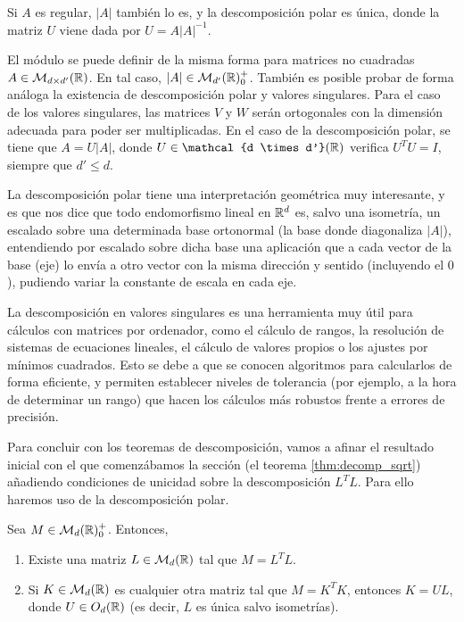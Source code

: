 \begin{remark}
    Si $A$ es regular, $|A|$ también lo es, y la descomposición polar es única, donde la matriz $U$ viene dada por $U = A|A|^{-1}$.
\end{remark}

\begin{remark} \label{rem:polar_generalized}
    El módulo se puede definir de la misma forma para matrices no cuadradas $A \in \mathcal{M}_{d \times d'}(\mathbb{R})$. En tal caso, $|A| \in \mathcal{M}_{d'}(\mathbb{R})^+_0$. También es posible probar de forma análoga la existencia de descomposición polar y valores singulares. Para el caso de los valores singulares, las matrices $V$ y $W$ serán ortogonales con la dimensión adecuada para poder ser multiplicadas. En el caso de la descomposición polar, se tiene que $A = U|A|$, donde $U \in \mathcal{d \times d'}(\R)$ verifica $U^TU = I$, siempre que $d' \le d$.
\end{remark}

La descomposición polar tiene una interpretación geométrica muy interesante, y es que nos dice que todo endomorfismo lineal en $\mathbb{R}^d$ es, salvo una isometría, un escalado sobre una determinada base ortonormal (la base donde diagonaliza $|A|$), entendiendo por escalado sobre dicha base una aplicación que a cada vector de la base (eje) lo envía a otro vector con la misma dirección y sentido (incluyendo el $0$), pudiendo variar la constante de escala en cada eje.

La descomposición en valores singulares es una herramienta muy útil para cálculos con matrices por ordenador, como el cálculo de rangos, la resolución de sistemas de ecuaciones lineales, el cálculo de valores propios o los ajustes por mínimos cuadrados. Esto se debe a que se conocen algoritmos para calcularlos de forma eficiente, y permiten establecer niveles de tolerancia (por ejemplo, a la hora de determinar un rango) que hacen los cálculos más robustos frente a errores de precisión.

Para concluir con los teoremas de descomposición, vamos a afinar el resultado inicial con el que comenzábamos la sección (el teorema \ref{thm:decomp_sqrt}) añadiendo condiciones de unicidad sobre la descomposición $L^TL$. Para ello haremos uso de la descomposición polar.

\begin{thm} \label{thm:psd_decomposition}
    Sea $M \in \mathcal{M}_d(\mathbb{R})^+_0$. Entonces,
    \begin{enumerate}
        \item Existe una matriz $L \in \mathcal{M}_d(\mathbb{R})$ tal que $M = L^TL$.
        \item Si $K \in \mathcal{M}_d(\mathbb{R})$ es cualquier otra matriz tal que $M = K^TK$, entonces $K = UL$, donde $U \in O_d(\mathbb{R})$ (es decir, $L$ es única salvo isometrías).
    \end{enumerate}
\end{thm}

